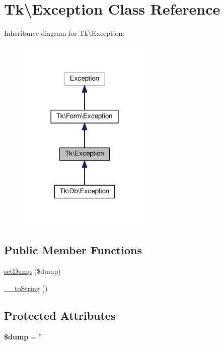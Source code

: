 \hypertarget{classTk_1_1Exception}{\section{Tk\textbackslash{}Exception Class Reference}
\label{classTk_1_1Exception}
}


Inheritance diagram for Tk\textbackslash{}Exception\+:\nopagebreak
\begin{figure}[H]
\begin{center}
\leavevmode
\includegraphics[width=180pt]{classTk_1_1Exception__inherit__graph}
\end{center}
\end{figure}
\subsection*{Public Member Functions}
\begin{DoxyCompactItemize}
\item 
\hyperlink{classTk_1_1Exception_ae0530af4a6ee6013addf3bf1aa6e8074}{set\+Dump} (\$dump)
\item 
\hyperlink{classTk_1_1Exception_aef26c3043785b1af9d850dd7ba278069}{\+\_\+\+\_\+to\+String} ()
\end{DoxyCompactItemize}
\subsection*{Protected Attributes}
\begin{DoxyCompactItemize}
\item 
\hypertarget{classTk_1_1Exception_a7723ab708d93d05f5b380dab1af6efe4}{{\bfseries \$dump} = ''}\label{classTk_1_1Exception_a7723ab708d93d05f5b380dab1af6efe4}

\end{DoxyCompactItemize}


